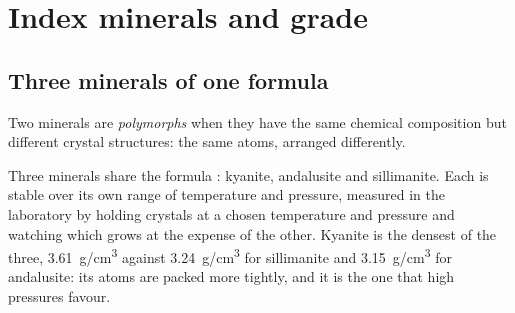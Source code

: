 \section{Index minerals and grade}

\subsection{Three minerals of one formula}

\begin{definition}[Polymorph]\label{def:g12:metamorphic-rocks:polymorph}
Two minerals are \emph{polymorphs} when they have the same
chemical composition but different crystal structures: the same atoms,
arranged differently.
\end{definition}

Three minerals share the formula : kyanite, andalusite and
sillimanite. Each is stable over its own range of temperature and pressure,
measured in the laboratory by holding crystals at a chosen temperature and
pressure and watching which  grows at the expense of the other. Kyanite is the densest of the three,
\qty{3.61}{g/cm^3} against \qty{3.24}{g/cm^3} for sillimanite and
\qty{3.15}{g/cm^3} for andalusite: its atoms are packed more tightly, and it
is the one that high pressures favour.


